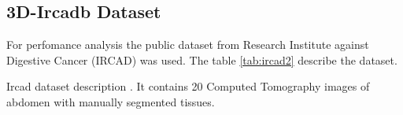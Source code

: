 \subsection{3D-Ircadb Dataset}

For perfomance analysis the public dataset from Research Institute against Digestive Cancer (IRCAD) \cite{ircadb} was used. 
The table 
\ref{tab:ircad2} describe the dataset.

% 

\begin{table}[h!]
\centering

\caption{Ircad dataset description \cite{ircadb}. It contains 20 Computed Tomography images of abdomen with 
manually segmented tissues.}
\label{tab:ircad2}
\end{table}